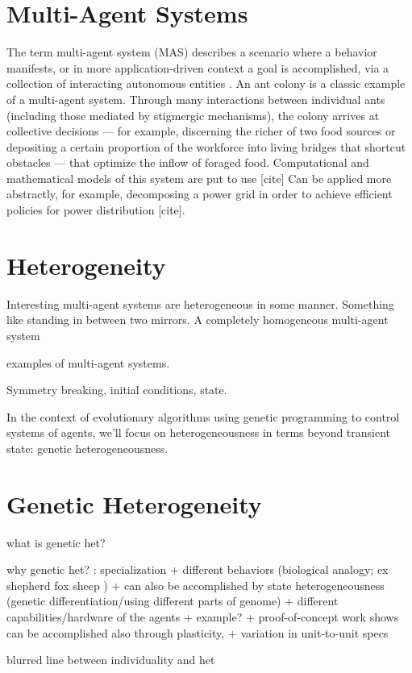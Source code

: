 \section{Multi-Agent Systems}

The term multi-agent system (MAS) describes a scenario where a behavior manifests, or in more application-driven context a goal is accomplished, via a collection of interacting autonomous entities \cite{ferber2003agents}.
An ant colony is a classic example of a multi-agent system.
Through many interactions between individual ants (including those mediated by stigmergic mechanisms), the colony arrives at collective decisions --- for example, discerning the richer of two food sources \cite{beckers1993modulation} or depositing a certain proportion of the workforce into living bridges that shortcut obstacles \cite{graham2017optimal} --- that optimize the inflow of foraged food.
Computational and mathematical models of this system are  put to use [cite]
Can be applied more abstractly, for example, decomposing a power grid in order to achieve efficient policies for power distribution [cite].

\section{Heterogeneity}

Interesting multi-agent systems are heterogeneous in some manner.
Something like standing in between two mirrors.
A completely homogeneous multi-agent system


examples of multi-agent systems.


Symmetry breaking, initial conditions, state. \cite{banda2015configuration} \cite{boldi1996symmetry} \cite{angluin1980local}

In the context of evolutionary algorithms using genetic programming to control systems of agents, we'll focus on heterogeneousness in terms beyond transient state: genetic heterogeneousness.

\section{Genetic Heterogeneity}

what is genetic het?

why genetic het? : specialization
+ different behaviors (biological analogy; ex shepherd fox sheep \cite{potter2001heterogeneity} )
  + can also be accomplished by state heterogeneousness (genetic differentiation/using different parts of genome) \cite{ferrante2015evolution}
+ different capabilities/hardware of the agents \cite{mathews2012supervised}
  + example?
  + proof-of-concept work shows can be accomplished also through plasticity, \cite{tuci2008evolving}
  + variation in unit-to-unit specs \cite{pugh2007parallel} \cite{duarte2016evolution}

blurred line between individuality and het
